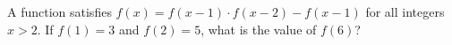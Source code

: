 A function satisfies $f(x)=f(x-1)\cdot f(x-2)-f(x-1)$ for all integers $x>2$. If $f(1)=3$ and $f(2)=5$, what is the value of $f(6)$?
